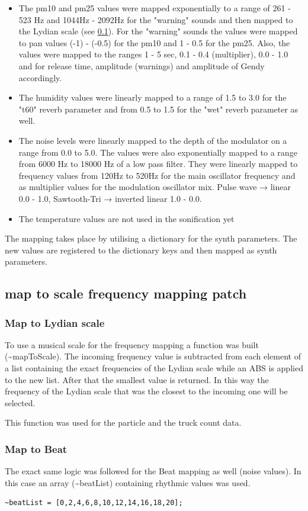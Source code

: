 \documentclass[11pt]{article}
\begin{document}
\begin{itemize}
\item The pm10 and pm25 values were mapped exponentially to a range of 261 - 523 Hz and 1044Hz - 2092Hz for the "warning" sounds and then mapped to the Lydian scale (see \ref{sec:orge64f5a9}).  For the "warning" sounds the values were mapped to pan values (-1) - (-0.5) for the pm10 and 1 - 0.5 for the pm25.  Also, the values were mapped to the ranges 1 - 5 sec, 0.1 - 0.4 (multiplier), 0.0 - 1.0 and for release time, amplitude (warnings) and amplitude of Gendy accordingly.
\item The humidity values were linearly mapped to a range of 1.5 to 3.0 for the "t60" reverb parameter and from 0.5 to 1.5 for the "wet" reverb parameter as well.
\item The noise levels were linearly mapped to the depth of the modulator on a range from 0.0 to 5.0.  The values were also exponentially mapped to a range from 6000 Hz to 18000 Hz of a low pass filter.  They were linearly mapped to frequency values from 120Hz to 520Hz for the main oscillator frequency and as multiplier values for the modulation oscillator mix.  Pulse wave → linear 0.0 - 1.0, Sawtooth-Tri → inverted linear 1.0 - 0.0.
\item The temperature values are not used in the sonification yet
\end{itemize}

The mapping takes place by utilising a dictionary for the synth parameters.  The new values are registered to the dictionary keys and then mapped as synth parameters.
\subsection{map to scale frequency mapping patch}
\label{sec:orge64f5a9}
\subsubsection{Map to Lydian scale}
\label{sec:org4150c8d}
To use a musical scale for the frequency mapping a function was built (\textasciitilde{}mapToScale).  The incoming frequency value is subtracted from each element of a list containing the exact frequencies of the Lydian scale while an ABS is applied to the new list.  After that the smallest value is returned.  In this way the frequency of the Lydian scale that was the closest to the incoming one will be selected.

This function was used for the particle and the truck count data.
\subsubsection{Map to Beat}
\label{sec:orgb0ce56c}
The exact same logic was followed for the Beat mapping as well (noise values).  In this case an array (\textasciitilde{}beatList) containing rhythmic values was used.
\begin{verbatim}
~beatList = [0,2,4,6,8,10,12,14,16,18,20];
\end{verbatim}
\end{document}
